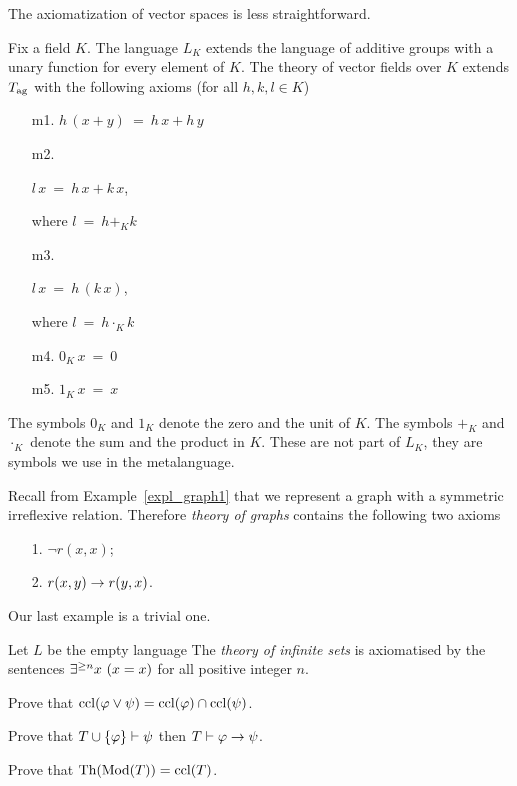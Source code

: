 \documentclass[creche.tex]{subfiles}
\begin{document}
The axiomatization of vector spaces is less straightforward.

\begin{example}
Fix a field $K$. The language $L_K$ extends the language of additive groups with a unary function for every element of $K$. The theory of vector fields over $K$ extends $T_{\rm ag}$ with the following axioms (for all $h,k,l\in K$)
\begin{itemize}
\item[m1.] $h\,(x+y)\ =\ h\,x+h\,y$
\item[m2.] \parbox{25ex}{$l\,x\ =\ h\,x+k\,x$,} where $l\ =\ h+_Kk$
\item[m3.] \parbox{25ex}{$l\,x\ =\ h\,(k\,x)$,} where $l\ =\ h\cdot_Kk$
\item[m4.] $0_K\,x\ =\ 0$
\item[m5.] $1_K\,x\ =\ x$
\end{itemize}
The symbols $0_K$ and $1_K$ denote the zero and the unit of $K$. The symbols $+_K$ and $\cdot_K$ denote the sum and the product in $K$. These are not part of $L_K$, they are symbols we use in the metalanguage.\QED
\end{example}

\begin{example}\label{expl_Tgraphs}
Recall from Example~\ref{expl_graph1} that we represent a graph with a symmetric irreflexive relation. Therefore \emph{theory of graphs\/} contains the following two axioms

\begin{itemize}
\item[1.] $\neg r(x,x)$;
\item[2.] $r(x,y)\rightarrow r(y,x)$.\QED
\end{itemize}
\end{example}

Our last example is a trivial one.

\begin{example}
Let $L$ be the empty language The \emph{theory of infinite sets\/} is axiomatised by the sentences $\E^{\ge n} x\ (x=x)$ for all positive integer $n$.\QED
\end{example}


\begin{exercise}
Prove that ${\rm ccl}(\varphi\vee \psi)={\rm ccl}(\varphi)\cap{\rm ccl}(\psi)$.\QED
\end{exercise}

\begin{exercise}\label{modus ponens}
Prove that $T\cup\{\varphi\}\vdash\psi$ then $T\vdash\varphi\rightarrow\psi$.\QED
\end{exercise}


\begin{exercise}
Prove that $\textrm{Th}(\mathop{\rm Mod}(T))={\rm ccl}(T)$.\QED
\end{exercise}
\end{document}
